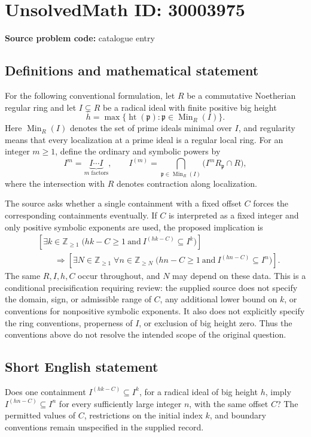\documentclass[11pt]{article}
\newcommand{\Z}{\mathbb{Z}}
\begin{document}
\section*{UnsolvedMath ID: 30003975}
\textbf{Source problem code:} catalogue entry
\subsection{Definitions and mathematical statement}
For the following conventional formulation, let \(R\) be a commutative Noetherian regular ring and let \(I\subsetneq R\) be a radical ideal with finite positive big height
\[
h=\max\{\operatorname{ht}(\mathfrak p):\mathfrak p\in\operatorname{Min}_R(I)\}.
\]
Here \(\operatorname{Min}_R(I)\) denotes the set of prime ideals minimal over \(I\), and regularity means that every localization at a prime ideal is a regular local ring. For an integer \(m\geq1\), define the ordinary and symbolic powers by
\[
I^m=\underbrace{I\cdots I}_{m\text{ factors}},\qquad
I^{(m)}=\bigcap_{\mathfrak p\in\operatorname{Min}_R(I)}\bigl(I^mR_{\mathfrak p}\cap R\bigr),
\]
where the intersection with \(R\) denotes contraction along localization.

The source asks whether a single containment with a fixed offset \(C\) forces the corresponding containments eventually. If \(C\) is interpreted as a fixed integer and only positive symbolic exponents are used, the proposed implication is
\[
\begin{split}
&\left[\exists k\in\Z_{\geq1}\;\bigl(hk-C\geq1\ \text{and}\ I^{(hk-C)}\subseteq I^k\bigr)\right]\\
&\qquad\Longrightarrow
\left[\exists N\in\Z_{\geq1}\;\forall n\in\Z_{\geq N}\;\bigl(hn-C\geq1\ \text{and}\ I^{(hn-C)}\subseteq I^n\bigr)\right].
\end{split}
\]
The same \(R,I,h,C\) occur throughout, and \(N\) may depend on these data. This is a conditional precisification requiring review: the supplied source does not specify the domain, sign, or admissible range of \(C\), any additional lower bound on \(k\), or conventions for nonpositive symbolic exponents. It also does not explicitly specify the ring conventions, properness of \(I\), or exclusion of big height zero. Thus the conventions above do not resolve the intended scope of the original question.
\subsection{Short English statement}
Does one containment \(I^{(hk-C)}\subseteq I^k\), for a radical ideal of big height \(h\), imply \(I^{(hn-C)}\subseteq I^n\) for every sufficiently large integer \(n\), with the same offset \(C\)? The permitted values of \(C\), restrictions on the initial index \(k\), and boundary conventions remain unspecified in the supplied record.
\end{document}
